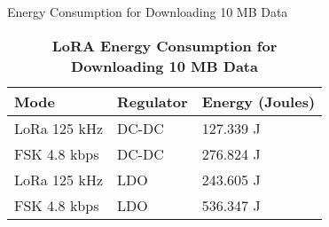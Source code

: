 \begin{table}[ht]
    \centering
    \small
    \caption{Energy Consumption for Downloading 10 MB Data}
    \begin{tabularx}{\columnwidth}{l l l}
    \toprule
    Mode & Regulator & Energy (Joules) \\
    \midrule
    LoRa 125 kHz & DC-DC & 127.339 J \\
    FSK 4.8 kbps & DC-DC & 276.824 J \\
    LoRa 125 kHz & LDO & 243.605 J \\
    FSK 4.8 kbps & LDO & 536.347 J \\
    \bottomrule
    \end{tabularx}
    \caption{\textbf{LoRA Energy Consumption for Downloading 10 MB Data}}
    \label{tab:loraRx}
\end{table}